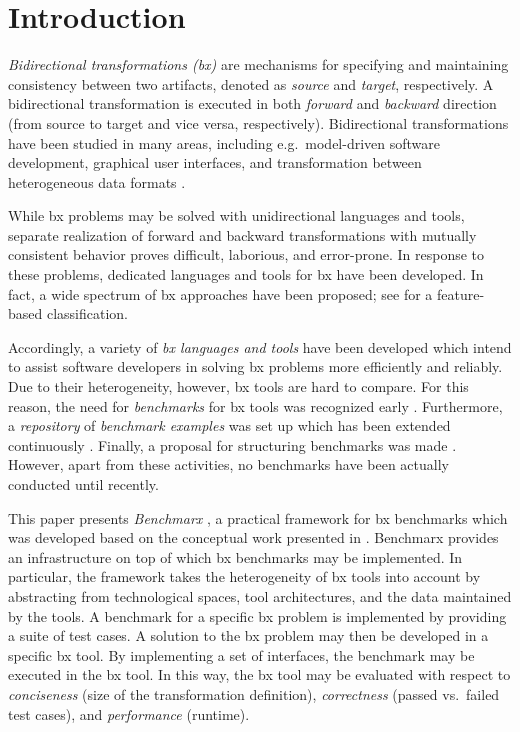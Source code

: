 \section{Introduction}
\label{sec:Introduction}



\noindent \emph{Bidirectional transformations (bx)} are mechanisms for specifying and maintaining consistency between two artifacts, denoted as \emph{source} and \emph{target}, respectively. A bidirectional transformation is executed in both \emph{forward} and \emph{backward} direction (from source to target and vice versa, respectively). Bidirectional transformations have been studied in many areas, including e.g.\ model-driven software development, graphical user interfaces, and transformation between heterogeneous data formats \cite{ICMT2009-Czarnecki}.

While bx problems may be solved with unidirectional languages and tools, separate realization of forward and backward transformations with mutually consistent behavior proves difficult, laborious, and error-prone. In response to these problems, dedicated languages and tools for bx have been developed. In fact, a wide spectrum of bx approaches have been proposed; see \cite{SOSYM-Hidaka2016} for a feature-based classification.

Accordingly, a variety of \emph{bx languages and tools} have been developed which intend to assist software developers in solving bx problems more efficiently and reliably. Due to their heterogeneity, however, bx tools are hard to compare. For this reason, the need for \emph{benchmarks} for bx tools was recognized early \cite{ICMT2009-Czarnecki}. Furthermore, a \emph{repository} of \emph{benchmark examples} was set up which has been extended continuously \cite{Cheney2014}. Finally, a proposal for structuring benchmarks was made \cite{AnjorinCG0RS14}. However, apart from these activities, no benchmarks have been actually conducted until recently.

This paper presents \emph{Benchmarx} \cite{Anjorin2017}, a practical framework for bx benchmarks which was developed based on the conceptual work presented in \cite{AnjorinCG0RS14}. Benchmarx provides an infrastructure on top of which bx benchmarks may be implemented. In particular, the framework takes the heterogeneity of bx tools into account by abstracting from technological spaces, tool architectures, and the data maintained by the tools. A benchmark for a specific bx problem is implemented by providing a suite of test cases. A solution to the bx problem may then be developed in a specific bx tool. By implementing a set of interfaces, the benchmark may be executed in the bx tool. In this way, the bx tool may be evaluated with respect to \emph{conciseness} (size of the transformation definition), \emph{correctness} (passed vs.\ failed test cases), and \emph{performance} (runtime).

